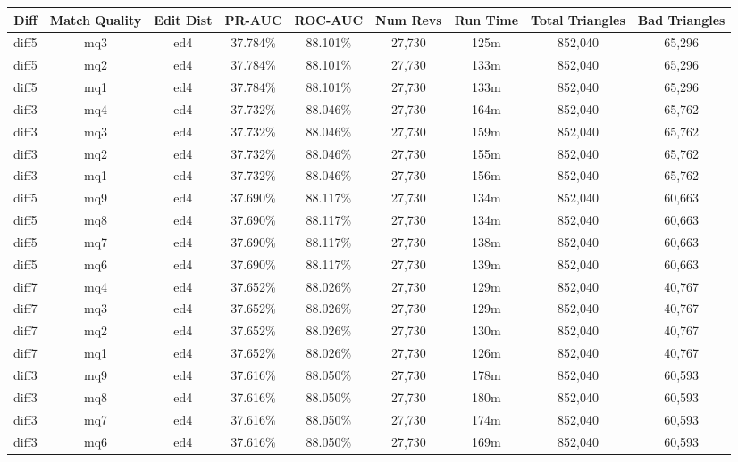 \begin{sidewaystable}[!ph]
  \begin{center}
    \begin{tabular}{|c|c|c||c|c||c|c|c|c|}
\hline
Diff & Match Quality & Edit Dist
        & PR-AUC & ROC-AUC
        & Num Revs & Run Time
        & Total Triangles & Bad Triangles \\
\hline
\hline
diff5 & mq3 & ed4 & 37.784\% & 88.101\% & 27,730 & 125m & 852,040 & 65,296 \\
diff5 & mq2 & ed4 & 37.784\% & 88.101\% & 27,730 & 133m & 852,040 & 65,296 \\
diff5 & mq1 & ed4 & 37.784\% & 88.101\% & 27,730 & 133m & 852,040 & 65,296 \\
diff3 & mq4 & ed4 & 37.732\% & 88.046\% & 27,730 & 164m & 852,040 & 65,762 \\
diff3 & mq3 & ed4 & 37.732\% & 88.046\% & 27,730 & 159m & 852,040 & 65,762 \\
diff3 & mq2 & ed4 & 37.732\% & 88.046\% & 27,730 & 155m & 852,040 & 65,762 \\
diff3 & mq1 & ed4 & 37.732\% & 88.046\% & 27,730 & 156m & 852,040 & 65,762 \\
diff5 & mq9 & ed4 & 37.690\% & 88.117\% & 27,730 & 134m & 852,040 & 60,663 \\
diff5 & mq8 & ed4 & 37.690\% & 88.117\% & 27,730 & 134m & 852,040 & 60,663 \\
diff5 & mq7 & ed4 & 37.690\% & 88.117\% & 27,730 & 138m & 852,040 & 60,663 \\
diff5 & mq6 & ed4 & 37.690\% & 88.117\% & 27,730 & 139m & 852,040 & 60,663 \\
diff7 & mq4 & ed4 & 37.652\% & 88.026\% & 27,730 & 129m & 852,040 & 40,767 \\
diff7 & mq3 & ed4 & 37.652\% & 88.026\% & 27,730 & 129m & 852,040 & 40,767 \\
diff7 & mq2 & ed4 & 37.652\% & 88.026\% & 27,730 & 130m & 852,040 & 40,767 \\
diff7 & mq1 & ed4 & 37.652\% & 88.026\% & 27,730 & 126m & 852,040 & 40,767 \\
diff3 & mq9 & ed4 & 37.616\% & 88.050\% & 27,730 & 178m & 852,040 & 60,593 \\
diff3 & mq8 & ed4 & 37.616\% & 88.050\% & 27,730 & 180m & 852,040 & 60,593 \\
diff3 & mq7 & ed4 & 37.616\% & 88.050\% & 27,730 & 174m & 852,040 & 60,593 \\
diff3 & mq6 & ed4 & 37.616\% & 88.050\% & 27,730 & 169m & 852,040 & 60,593 \\

\end{tabular}
\end{center}
\end{sidewaystable}
